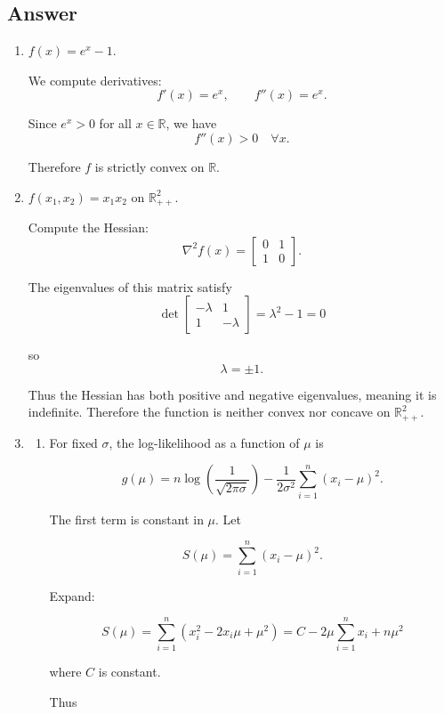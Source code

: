 \documentclass[
  12pt,
]{fphw}
\begin{document}
\subsection*{Answer}

\begin{enumerate}

\item[(a)] 
$f(x) = e^x - 1$.

We compute derivatives:
\[
f'(x) = e^x, \qquad f''(x) = e^x.
\]

Since $e^x > 0$ for all $x \in \mathbb{R}$, we have
\[
f''(x) > 0 \quad \forall x.
\]

Therefore $f$ is strictly convex on $\mathbb{R}$.

\item[(b)] 
$f(x_1,x_2)=x_1x_2$ on $\mathbb{R}_{++}^2$.

Compute the Hessian:
\[
\nabla^2 f(x) =
\begin{bmatrix}
0 & 1 \\
1 & 0
\end{bmatrix}.
\]

The eigenvalues of this matrix satisfy
\[
\det
\begin{bmatrix}
-\lambda & 1 \\
1 & -\lambda
\end{bmatrix}
= \lambda^2 -1 =0
\]

so
\[
\lambda = \pm 1.
\]

Thus the Hessian has both positive and negative eigenvalues, meaning it is indefinite. Therefore the function is neither convex nor concave on $\mathbb{R}_{++}^2$.

\item[(c)]

\begin{enumerate}

\item[(i)]
For fixed $\sigma$, the log-likelihood as a function of $\mu$ is

\[
g(\mu)=
n\log\left(\frac{1}{\sqrt{2\pi\sigma}}\right)
-
\frac{1}{2\sigma^2}\sum_{i=1}^n (x_i-\mu)^2.
\]

The first term is constant in $\mu$. Let

\[
S(\mu)=\sum_{i=1}^n (x_i-\mu)^2.
\]

Expand:

\[
S(\mu)=\sum_{i=1}^n(x_i^2-2x_i\mu+\mu^2)
= C -2\mu\sum_{i=1}^n x_i + n\mu^2
\]

where $C$ is constant.

Thus


\end{enumerate}
\end{enumerate}
\end{document}
